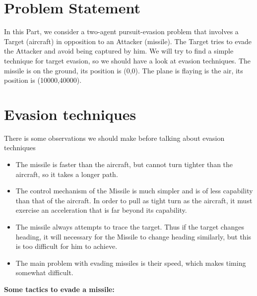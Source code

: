 \label{introTA}
\section{Problem Statement}
In this Part, we consider a two-agent pursuit-evasion problem that involves  a Target (aircraft) in opposition to an Attacker (missile). The Target tries to evade the Attacker and avoid being captured by him. We will try to find a simple technique for target evasion, so we should have a look at evasion techniques.
The missile is on the ground, its position is (0,0). The plane is flaying is the air, its position is (10000,40000).

\section{Evasion techniques}
There is some observations we should make before talking about evasion techniques 
\begin{itemize}
	\item The missile is faster than the aircraft, but cannot turn tighter than the aircraft, so it takes a longer path.
	\item The control mechanism of the Missile is much simpler and is of less capability than that of the aircraft. In order to pull as tight turn as the aircraft, it must exercise an acceleration that is far beyond its capability.
	\item The missile always attempts to trace the target. Thus if the target changes heading, it will necessary for the Missile to change heading similarly, but this is too difficult for him to achieve.
	\item  The main problem with evading missiles is their speed, which makes timing somewhat difficult.
\end{itemize}
\textbf{Some tactics to evade a missile:}
